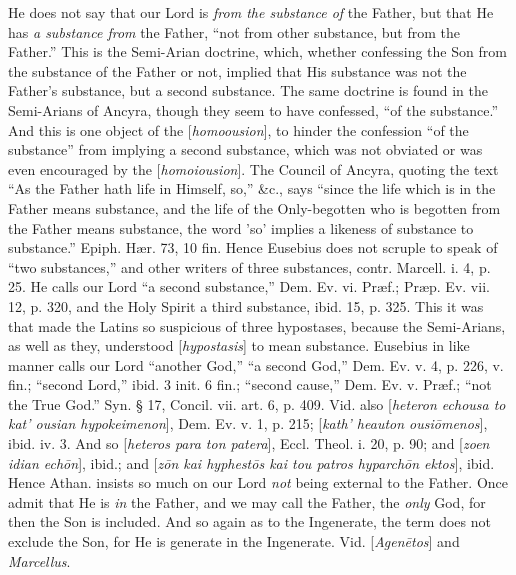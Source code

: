 He does not say that our Lord is \emph{from the
substance of} the
Father, but that He has \emph{a substance from}
the Father, ``not from other substance, but from the Father.''
This is the Semi-Arian doctrine, which, whether confessing the Son
from the substance of the Father or not, implied that His substance
was not the Father's substance, but a second substance. The same
doctrine is found in the Semi-Arians of Ancyra, though they seem to
have confessed, ``of the substance.'' And this is one object of the [\emph{homoousion}],
to hinder the confession ``of the substance'' from implying a second
substance, which was not obviated or was even encouraged by the [\emph{homoiousion}].
The Council of Ancyra, quoting the text ``As the Father hath life in
Himself, so,'' \&c., says ``since
the life which is in the Father means substance, and the life of the
Only-begotten who is begotten from the Father means substance, the
word 'so' implies a likeness of substance to substance.'' Epiph. Hær.
73, 10 fin. Hence Eusebius does not scruple to speak of ``two
substances,'' and other writers of three substances, contr. Marcell. i.
4, p. 25. He calls our Lord ``a second substance,'' Dem. Ev. vi. Præf.;
Præp. Ev. vii. 12, p. 320, and the Holy Spirit a third substance,
ibid. 15, p. 325. This it was that made the Latins so suspicious of
three hypostases, because the Semi-Arians, as well as they, understood
[\emph{hypostasis}] to mean substance. Eusebius in like manner calls
our Lord ``another
God,'' ``a second God,'' Dem. Ev. v. 4, p. 226, v. fin.; ``second
Lord,'' ibid. 3 init. 6 fin.; ``second
cause,'' Dem. Ev. v. Præf.; ``not
the True God.'' Syn. § 17, Concil. vii. art. 6, p. 409. Vid. also [\emph{heteron
echousa to kat' ousian hypokeimenon}], Dem. Ev. v. 1, p. 215; [\emph{kath'
heauton ousi\={o}menos}], ibid. iv. 3. And so [\emph{heteros
para ton patera}], Eccl. Theol. i. 20, p. 90; and [\emph{zoen
idian ech\={o}n}], ibid.; and [\emph{z\={o}n kai hyphest\={o}s
kai tou patros hyparch\={o}n ektos}], ibid. Hence Athan. insists
so much on our Lord \emph{not}
being external to the Father. Once admit that He is \emph{in}
the Father, and we may call the Father, the \emph{only}
God, for then the Son is included. And so again as to the
Ingenerate, the term does not exclude the Son, for He is generate in
the Ingenerate. Vid. [\emph{Agen\={e}tos}] and \emph{Marcellus}.

